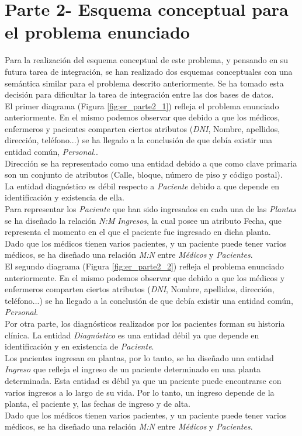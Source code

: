 \documentclass{article}
\begin{document}
\section{Parte 2- Esquema conceptual para el problema enunciado}

Para la realización del esquema conceptual de este problema, y pensando en su futura tarea de integración, se han realizado dos esquemas conceptuales con una semántica similar para el problema descrito anteriormente. Se ha tomado esta decisión para dificultar la tarea de integración entre las dos bases de datos.\\

El primer diagrama (Figura \ref{fig:er_parte2_1}) refleja el problema enunciado anteriormente. En el mismo podemos observar que debido a que los médicos, enfermeros y pacientes comparten ciertos atributos (\emph{DNI}, Nombre, apellidos, dirección, teléfono...) se ha llegado a la conclusión de que debía existir una entidad común, \emph{Personal}..\\
Dirección se ha representado como una entidad debido a que como clave primaria son un conjunto de atributos (Calle, bloque, número de piso y código postal).\\
La entidad diagnóstico es débil respecto a \emph{Paciente} debido a que depende en identificación y existencia de ella.\\
Para representar los \emph{Paciente} que han sido ingresados en cada una de las \emph{Plantas} se ha diseñado la relación \emph{N:M} \emph{Ingresos}, la cual posee un atributo Fecha, que representa el momento en el que el paciente fue ingresado en dicha planta.\\
Dado que los médicos tienen varios pacientes, y un paciente puede tener varios médicos, se ha diseñado una relación \emph{M:N} entre \emph{Médicos} y \emph{Pacientes}.\\

El segundo diagrama (Figura \ref{fig:er_parte2_2}) refleja el problema enunciado anteriormente. En el mismo podemos observar que debido a que los médicos y enfermeros comparten ciertos atributos (\emph{DNI}, Nombre, apellidos, dirección, teléfono...) se ha llegado a la conclusión de que debía existir una entidad común, \emph{Personal}.\\
Por otra parte, los diagnósticos realizados por los pacientes forman su historia clínica. La entidad \emph{Diagnóstico} es una entidad débil ya que depende en identificación y en existencia de \emph{Paciente}.\\
Los pacientes ingresan en plantas, por lo tanto, se ha diseñado una entidad \emph{Ingreso} que refleja el ingreso de un paciente determinado en una planta determinada. Esta entidad es débil ya que un paciente puede encontrarse con varios ingresos a lo largo de su vida. Por lo tanto, un ingreso depende de la planta, el paciente y, las fechas de ingreso y de alta.\\
Dado que los médicos tienen varios pacientes, y un paciente puede tener varios médicos, se ha diseñado una relación \emph{M:N} entre \emph{Médicos} y \emph{Pacientes}.
\end{document}
